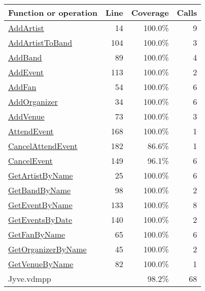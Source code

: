 \begin{longtable}{|l|r|r|r|}
\hline
Function or operation & Line & Coverage & Calls \\
\hline
\hline
\hyperref[AddArtist:14]{AddArtist} & 14&100.0\% & 9 \\
\hline
\hyperref[AddArtistToBand:104]{AddArtistToBand} & 104&100.0\% & 3 \\
\hline
\hyperref[AddBand:89]{AddBand} & 89&100.0\% & 4 \\
\hline
\hyperref[AddEvent:113]{AddEvent} & 113&100.0\% & 2 \\
\hline
\hyperref[AddFan:54]{AddFan} & 54&100.0\% & 6 \\
\hline
\hyperref[AddOrganizer:34]{AddOrganizer} & 34&100.0\% & 6 \\
\hline
\hyperref[AddVenue:73]{AddVenue} & 73&100.0\% & 3 \\
\hline
\hyperref[AttendEvent:168]{AttendEvent} & 168&100.0\% & 1 \\
\hline
\hyperref[CancelAttendEvent:182]{CancelAttendEvent} & 182&86.6\% & 1 \\
\hline
\hyperref[CancelEvent:149]{CancelEvent} & 149&96.1\% & 6 \\
\hline
\hyperref[GetArtistByName:25]{GetArtistByName} & 25&100.0\% & 6 \\
\hline
\hyperref[GetBandByName:98]{GetBandByName} & 98&100.0\% & 2 \\
\hline
\hyperref[GetEventByName:133]{GetEventByName} & 133&100.0\% & 8 \\
\hline
\hyperref[GetEventsByDate:140]{GetEventsByDate} & 140&100.0\% & 2 \\
\hline
\hyperref[GetFanByName:65]{GetFanByName} & 65&100.0\% & 6 \\
\hline
\hyperref[GetOrganizerByName:45]{GetOrganizerByName} & 45&100.0\% & 2 \\
\hline
\hyperref[GetVenueByName:82]{GetVenueByName} & 82&100.0\% & 1 \\
\hline
\hline
Jyve.vdmpp & & 98.2\% & 68 \\
\hline
\end{longtable}

